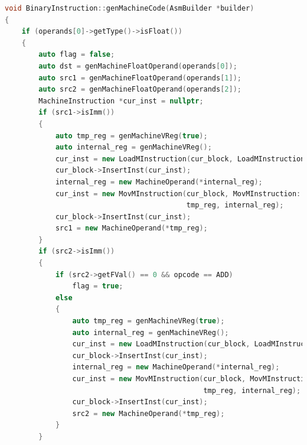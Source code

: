 \documentclass[UTF8,a4paper,10pt]{ctexart}
\begin{document}
\begin{lstlisting}[title = 生成目标代码, language = c++]
void BinaryInstruction::genMachineCode(AsmBuilder *builder)
{
    if (operands[0]->getType()->isFloat())
    {
        auto flag = false;
        auto dst = genMachineFloatOperand(operands[0]);
        auto src1 = genMachineFloatOperand(operands[1]);
        auto src2 = genMachineFloatOperand(operands[2]);
        MachineInstruction *cur_inst = nullptr;
        if (src1->isImm())
        {
            auto tmp_reg = genMachineVReg(true);
            auto internal_reg = genMachineVReg();
            cur_inst = new LoadMInstruction(cur_block, LoadMInstruction::LDR, internal_reg, src1);
            cur_block->InsertInst(cur_inst);
            internal_reg = new MachineOperand(*internal_reg);
            cur_inst = new MovMInstruction(cur_block, MovMInstruction::VMOV,
                                           tmp_reg, internal_reg);
            cur_block->InsertInst(cur_inst);
            src1 = new MachineOperand(*tmp_reg);
        }
        if (src2->isImm())
        {
            if (src2->getFVal() == 0 && opcode == ADD)
                flag = true;
            else
            {
                auto tmp_reg = genMachineVReg(true);
                auto internal_reg = genMachineVReg();
                cur_inst = new LoadMInstruction(cur_block, LoadMInstruction::LDR, internal_reg, src2);
                cur_block->InsertInst(cur_inst);
                internal_reg = new MachineOperand(*internal_reg);
                cur_inst = new MovMInstruction(cur_block, MovMInstruction::VMOV,
                                               tmp_reg, internal_reg);
                cur_block->InsertInst(cur_inst);
                src2 = new MachineOperand(*tmp_reg);
            }
        }


\end{lstlisting}
\end{document}
